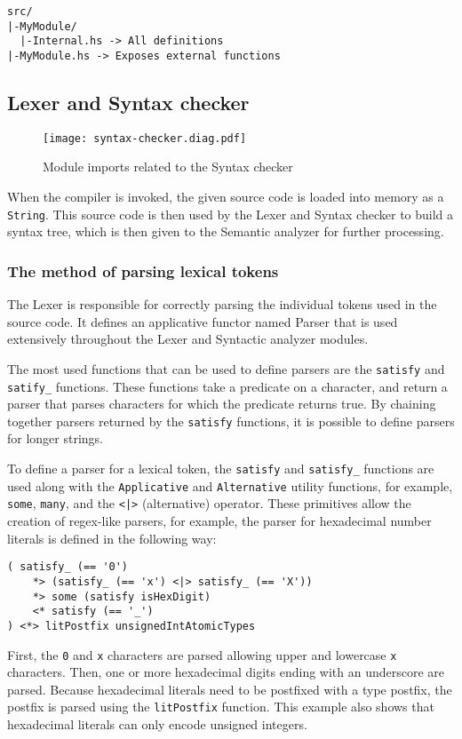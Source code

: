 \documentclass[12pt]{article}
\begin{document}
\lstset{numbers=none}
\begin{lstlisting}
src/
|-MyModule/
  |-Internal.hs -> All definitions
|-MyModule.hs -> Exposes external functions
\end{lstlisting}
\lstset{numbers=left}

\subsection{Lexer and Syntax checker}

\begin{figure}[t]
\texttt{[image: syntax-checker.diag.pdf]}
\centering
\caption{Module imports related to the Syntax checker}
\end{figure}

When the compiler is invoked, the given source code is loaded into memory as a
\verb$String$. This source code is then used by the Lexer and
Syntax checker to build a syntax tree, which is then given to the
Semantic analyzer for further processing.

\subsubsection{The method of parsing lexical tokens}

The Lexer is responsible for correctly parsing the individual tokens used in the
source code. It defines an applicative functor named Parser that is used
extensively throughout the Lexer and Syntactic analyzer modules. 

The most used functions that can be used to define parsers are the
\verb$satisfy$ and \verb$satify_$ functions. These functions take a predicate on
a character, and return a parser that parses characters for which the predicate
returns true. By chaining together parsers returned by the \verb$satisfy$
functions, it is possible to define parsers for longer strings.

To define a parser for a lexical token, the \verb$satisfy$ and \verb$satisfy_$
functions are used along with the \verb$Applicative$ and \verb$Alternative$
utility functions, for example, \verb$some$, \verb$many$, and the \verb$<|>$
(alternative) operator. These primitives allow the creation of regex-like
parsers, for example, the parser for hexadecimal number literals is defined in
the following way:
\\\noindent\begin{minipage}{\textwidth}
\begin{lstlisting}
( satisfy_ (== '0')
    *> (satisfy_ (== 'x') <|> satisfy_ (== 'X'))
    *> some (satisfy isHexDigit)
    <* satisfy (== '_')
) <*> litPostfix unsignedIntAtomicTypes
\end{lstlisting}
\end{minipage}
First, the \verb$0$ and \verb$x$ characters are parsed allowing upper and
lowercase \verb$x$ characters. Then, one or more hexadecimal digits ending with
an underscore are parsed. Because hexadecimal literals need to be postfixed with
a type postfix, the postfix is parsed using the \verb$litPostfix$ function. This
example also shows that hexadecimal literals can only encode unsigned integers.
\end{document}
